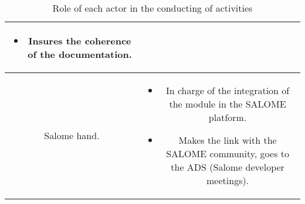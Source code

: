 \begin{table}[H]
\begin{tabular}{cc}
\begin{minipage}[l]{12cm}
\begin{itemize}
\item Insures the coherence of the documentation.
\end{itemize}
\end{minipage}\\
\midrule
Salome hand. &
\begin{minipage}[l]{12cm}
\begin{itemize}
\itemsep-5pt
\item In charge of the integration of the \telemacsystem{} module in the SALOME
  platform.
\item Makes the link with the SALOME community, goes to the ADS (Salome
  developer meetings).
\end{itemize}
\end{minipage}\\
\bottomrule
\end{tabular}
\caption{\label{rea} Role of each actor in the conducting of \telemacsystem{} activities}
\end{table}
